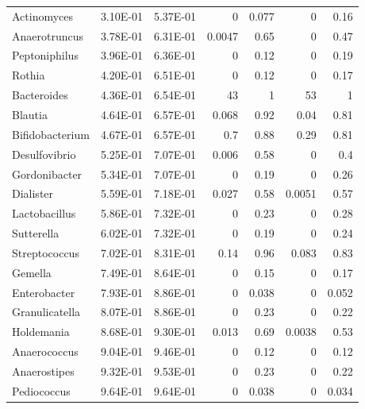 {\begin{longtable}{ | l | r | r | r | r | r | r  | }
		Actinomyces & 3.10E-01 & 5.37E-01 & 0 & 0.077 & 0 & 0.16 \\ 
		Anaerotruncus & 3.78E-01 & 6.31E-01 & 0.0047 & 0.65 & 0 & 0.47 \\ 
		Peptoniphilus & 3.96E-01 & 6.36E-01 & 0 & 0.12 & 0 & 0.19 \\ 
		Rothia & 4.20E-01 & 6.51E-01 & 0 & 0.12 & 0 & 0.17 \\ 
		Bacteroides & 4.36E-01 & 6.54E-01 & 43 & 1 & 53 & 1 \\ 
		Blautia & 4.64E-01 & 6.57E-01 & 0.068 & 0.92 & 0.04 & 0.81 \\ 
		Bifidobacterium & 4.67E-01 & 6.57E-01 & 0.7 & 0.88 & 0.29 & 0.81 \\ 
		Desulfovibrio & 5.25E-01 & 7.07E-01 & 0.006 & 0.58 & 0 & 0.4 \\ 
		Gordonibacter & 5.34E-01 & 7.07E-01 & 0 & 0.19 & 0 & 0.26 \\ 
		Dialister & 5.59E-01 & 7.18E-01 & 0.027 & 0.58 & 0.0051 & 0.57 \\ 
		Lactobacillus & 5.86E-01 & 7.32E-01 & 0 & 0.23 & 0 & 0.28 \\ 
		Sutterella & 6.02E-01 & 7.32E-01 & 0 & 0.19 & 0 & 0.24 \\ 
		Streptococcus & 7.02E-01 & 8.31E-01 & 0.14 & 0.96 & 0.083 & 0.83 \\ 
		Gemella & 7.49E-01 & 8.64E-01 & 0 & 0.15 & 0 & 0.17 \\ 
		Enterobacter & 7.93E-01 & 8.86E-01 & 0 & 0.038 & 0 & 0.052 \\ 
		Granulicatella & 8.07E-01 & 8.86E-01 & 0 & 0.23 & 0 & 0.22 \\ 
		Holdemania & 8.68E-01 & 9.30E-01 & 0.013 & 0.69 & 0.0038 & 0.53 \\ 
		Anaerococcus & 9.04E-01 & 9.46E-01 & 0 & 0.12 & 0 & 0.12 \\ 
		Anaerostipes & 9.32E-01 & 9.53E-01 & 0 & 0.23 & 0 & 0.22 \\ 
		Pediococcus & 9.64E-01 & 9.64E-01 & 0 & 0.038 & 0 & 0.034
		
	\end{longtable}
}







